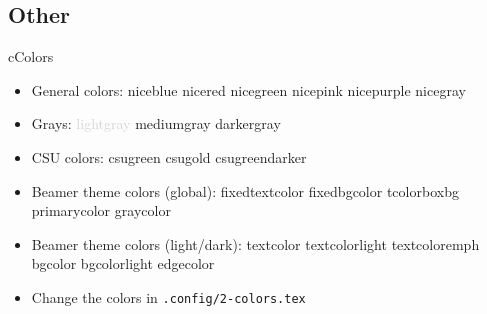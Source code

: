 \subsection*{Other}
\begin{myslide}{c}{Colors}

\begin{itemize}

\item General colors:
\textcolor{niceblue}{niceblue}
\textcolor{nicered}{nicered}
\textcolor{nicegreen}{nicegreen}
\textcolor{nicepink}{nicepink}
\textcolor{nicepurple}{nicepurple}
\textcolor{nicegray}{nicegray}

\item Grays:
\textcolor{lightgray}{lightgray}
\textcolor{mediumgray}{mediumgray}
\textcolor{darkergray}{darkergray}

\item CSU colors:
\textcolor{csugreen}{csugreen}
\textcolor{csugold}{csugold}
\textcolor{csugreendarker}{csugreendarker}


\item Beamer theme colors (global):
\textcolor{fixedtextcolor}{fixedtextcolor}
\textcolor{fixedbgcolor}{fixedbgcolor}
\textcolor{tcolorboxbg}{tcolorboxbg}
\textcolor{primarycolor}{primarycolor}
\textcolor{graycolor}{graycolor}

\item Beamer theme colors (light/dark):
\textcolor{textcolor}{textcolor}
\textcolor{textcolorlight}{textcolorlight}
\textcolor{textcoloremph}{textcoloremph}
\textcolor{bgcolor}{bgcolor}
\textcolor{bgcolorlight}{bgcolorlight}
\textcolor{edgecolor}{edgecolor}

\item Change the colors in \lstinline{.config/2-colors.tex}

\end{itemize}

\end{myslide}


